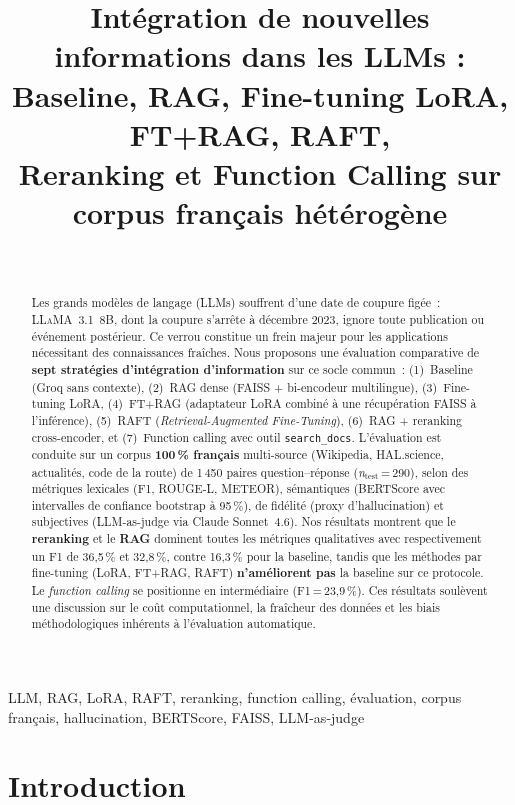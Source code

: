\documentclass[10pt,journal,compsoc]{IEEEtran}
\title{Intégration de nouvelles informations dans les LLMs :\\
Baseline, RAG, Fine-tuning LoRA, FT+RAG, RAFT,\\
Reranking et Function Calling sur corpus français hétérogène}
\author{%
  \IEEEauthorblockN{Abdoul Karim Coulibaly}\\
  \IEEEauthorblockA{%
    CESI École d'Ingénieurs, Saint-Nazaire, France\\
    \textit{Projet pédagogique --- FISE A4 Data Science \& IA, 2025--2026}\\
    \href{mailto:abdoulkarim.coulibaly@viaacesi.fr}{abdoulkarim.coulibaly@viaacesi.fr}\\
    \url{https://github.com/coulby45/llm-integration-pipeline}
  }
}
\newcommand{\bs}{BERTScore}
\newcommand{\rl}{ROUGE-L}
\newcommand{\met}{METEOR}
\begin{document}
\maketitle

\begin{abstract}
Les grands modèles de langage (LLMs) souffrent d'une date de coupure
figée~: \textsc{LLaMA~3.1~8B}, dont la coupure s'arrête à décembre
2023, ignore toute publication ou événement postérieur. Ce verrou
constitue un frein majeur pour les applications nécessitant des
connaissances fraîches. Nous proposons une évaluation comparative
de \textbf{sept stratégies d'intégration d'information} sur ce socle
commun~: (1)~Baseline (Groq sans contexte), (2)~RAG dense (FAISS +
bi-encodeur multilingue), (3)~Fine-tuning LoRA, (4)~FT+RAG (adaptateur
LoRA combiné à une récupération FAISS à l'inférence), (5)~RAFT
(\textit{Retrieval-Augmented Fine-Tuning}), (6)~RAG + reranking
cross-encoder, et (7)~Function calling avec outil \texttt{search\_docs}.
L'évaluation est conduite sur un corpus \textbf{100\,\% français}
multi-source (Wikipedia, HAL.science, actualités, code de la route)
de 1\,450 paires question--réponse (\textit{n}$_\text{test}$\,=\,290),
selon des métriques lexicales (F1, \rl, \met), sémantiques (\bs{}
avec intervalles de confiance bootstrap à 95\,\%), de fidélité
(proxy d'hallucination) et subjectives (LLM-as-judge via
Claude Sonnet~4.6). Nos résultats montrent que le \textbf{reranking}
et le \textbf{RAG} dominent toutes les métriques qualitatives avec
respectivement un F1 de 36,5\,\% et 32,8\,\%, contre 16,3\,\% pour
la baseline, tandis que les méthodes par fine-tuning (LoRA, FT+RAG,
RAFT) \textbf{n'améliorent pas} la baseline sur ce protocole. Le
\textit{function calling} se positionne en intermédiaire (F1\,=\,23,9\,\%).
Ces résultats soulèvent une discussion sur le coût computationnel,
la fraîcheur des données et les biais méthodologiques inhérents
à l'évaluation automatique.
\end{abstract}

\begin{IEEEkeywords}
LLM, RAG, LoRA, RAFT, reranking, function calling, évaluation,
corpus français, hallucination, BERTScore, FAISS, LLM-as-judge
\end{IEEEkeywords}


\section{Introduction}
\label{sec:intro}
\end{document}
